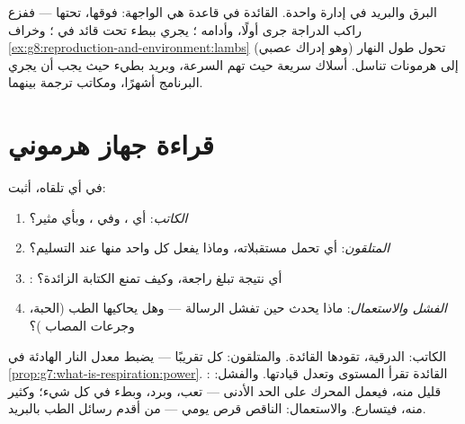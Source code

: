 \begin{remark}\label{rem:g8:hormonal-communication:partnership}
البرق والبريد في
 إدارة
واحدة.  القائدة في قاعدة  هي الواجهة:
 فوقها،  تحتها --- ففزع راكب
الدراجة جرى  أولًا، وأدامه ؛  يجري
ببطء  تحت قائد في ؛ وخراف
\cref{ex:g8:reproduction-and-environment:lambs} تحول طول
النهار (وهو إدراك عصبي) إلى هرمونات تناسل. أسلاك سريعة
حيث تهم السرعة، وبريد بطيء حيث يجب أن يجري البرنامج
أشهرًا، ومكاتب ترجمة بينهما.
\end{remark}

\section{قراءة جهاز هرموني}

\begin{method}\label{met:g8:hormonal-communication:read}
في أي  تلقاه، أثبت:
\begin{enumerate}
  \item \emph{الكاتب}: أي ، وفي ، وبأي مثير؟
  \item \emph{المتلقون}: أي  تحمل مستقبلاته،
        وماذا يفعل كل واحد منها عند التسليم؟
  \item \emph{}: أي نتيجة تبلغ راجعة،
        وكيف تمنع الكتابة الزائدة؟
  \item \emph{الفشل والاستعمال}: ماذا يحدث حين تفشل
        الرسالة --- وهل يحاكيها الطب (الحبة، وجرعات
        المصاب )؟
\end{enumerate}
\end{method}

\begin{example}\label{ex:g8:hormonal-communication:thyroid}
الكاتب: الدرقية، تقودها  القائدة. والمتلقون: كل
 تقريبًا ---  يضبط معدل النار الهادئة في
\cref{prop:g7:what-is-respiration:power}. :  القائدة تقرأ المستوى وتعدل قيادتها.
والفشل: قليل منه، فيعمل المحرك على الحد الأدنى --- تعب،
وبرد، وبطء في كل شيء؛ وكثير منه، فيتسارع. والاستعمال:
 الناقص قرص يومي --- من أقدم رسائل الطب بالبريد.
\end{example}


